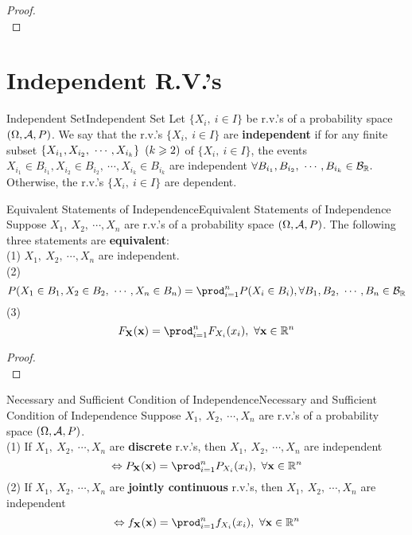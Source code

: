 \documentclass{elegantbook}
\begin{document}
\begin{proof}
\\[4cm]\vspace{0.01cm}
\end{proof}

\section{Independent R.V.'s}

\begin{definition}{Independent Set}{Independent Set}
Let \(\{X_{i},\ i \in I\}\) be r.v.'s of a probability space $(\Omega,\mathcal{A}, P)$. We say that the r.v.'s \(\{X_{i},\ i \in I\}\) are \textbf{independent} if for any finite subset
\(\left\{ X_{i_{1}},X_{i_{2}},\ \cdots,X_{i_{k}} \right\}\ (k \geqslant 2)\) of \(\{ X_{i},\ i \in I\}\), the events \(X_{i_{1}} \in B_{i_{1}},X_{i_{2}} \in B_{i_{2}},\ \cdots,X_{i_{k}} \in B_{i_{k}}\) are independent \(\forall B_{i_{1}},B_{i_{2}},\ \cdots,B_{i_{k}} \in \mb_{\mathbb{R}}.\) Otherwise, the r.v.'s \(\{X_{i},\ i \in I\}\) are dependent.
\end{definition}

\begin{theorem}{Equivalent Statements of Independence}{Equivalent Statements of Independence}
Suppose \(X_{1},\ X_{2},\ \cdots,X_{n}\) are r.v.'s of a probability space $(\Omega,\mathcal{A}, P)$. The following three statements are \textbf{equivalent}:\\
(1) \(X_{1},\ X_{2},\ \cdots,X_{n}\) are independent.\\
(2)
\[P( X_{1} \in B_{1},X_{2} \in B_{2},\ \cdots,X_{n} \in B_{n}) = \prod_{i = 1}^{n}{P(X_{i} \in B_{i})},\forall B_{1},B_{2},\ \cdots,B_{n} \in \mb_{\mathbb{R}}\]
(3)
\[F_{\mX}(\mx) = \prod_{i = 1}^{n}{F_{X_{i}}(x_{i})},\ \forall \mx\in \mathbb{R}^{n}\]
\end{theorem}

\begin{proof}
\\[4cm]\vspace{0.01cm}
\end{proof}

\begin{theorem}{Necessary and Suf\/f\/icient Condition of Independence}{Necessary and Sufficient Condition of Independence}
Suppose \(X_{1},\ X_{2},\ \cdots,X_{n}\) are r.v.'s of a probability
space $(\Omega,\mathcal{A}, P)$.\\
(1) If \(X_{1},\ X_{2},\ \cdots,X_{n}\) are \textbf{discrete} r.v.'s, then \(X_{1},\ X_{2},\ \cdots,X_{n}\) are independent
\[\Leftrightarrow P_{\mX}(\mx) = \prod_{i = 1}^{n}{P_{X_{i}}(x_{i})},\ \forall\mx \in \mathbb{R}^{n}\]
(2) If \(X_{1},\ X_{2},\ \cdots,X_{n}\) are \textbf{jointly continuous}
r.v.'s, then \(X_{1},\ X_{2},\ \cdots,X_{n}\) are independent
\[\Leftrightarrow f_{\mX}(\mx) = \prod_{i = 1}^{n}{f_{X_{i}}(x_{i})},\ \forall \mx\in \mathbb{R}^{n}\]
\end{theorem}
\end{document}
